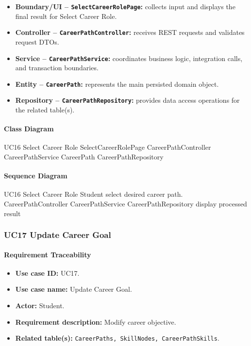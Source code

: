 \begin{itemize}
    \item \textbf{Boundary/UI -- \texttt{SelectCareerRolePage}:} collects input and displays the final result for Select Career Role.
    \item \textbf{Controller -- \texttt{CareerPathController}:} receives REST requests and validates request DTOs.
    \item \textbf{Service -- \texttt{CareerPathService}:} coordinates business logic, integration calls, and transaction boundaries.
    \item \textbf{Entity -- \texttt{CareerPath}:} represents the main persisted domain object.
    \item \textbf{Repository -- \texttt{CareerPathRepository}:} provides data access operations for the related table(s).
\end{itemize}

\paragraph{Class Diagram}

\ClassDiagram
{UC16 Select Career Role}
{SelectCareerRolePage}
{CareerPathController}
{CareerPathService}
{CareerPath}
{CareerPathRepository}

\paragraph{Sequence Diagram}

\SequenceDiagram
{UC16 Select Career Role}
{Student}
{select desired career path.}
{CareerPathController}
{CareerPathService}
{CareerPathRepository}
{display processed result}

\subsubsection{UC17 Update Career Goal}

\paragraph{Requirement Traceability}

\begin{itemize}
    \item \textbf{Use case ID:} UC17.
    \item \textbf{Use case name:} Update Career Goal.
    \item \textbf{Actor:} Student.
    \item \textbf{Requirement description:} Modify career objective.
    \item \textbf{Related table(s):} \texttt{CareerPaths, SkillNodes, CareerPathSkills}.
\end{itemize}

